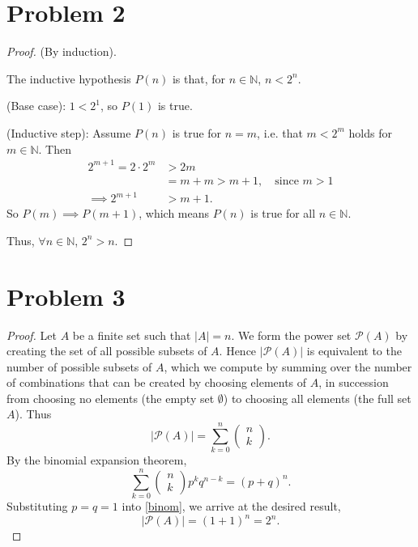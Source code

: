 \documentclass{article}
\begin{document}
\section*{Problem 2}
\begin{proof}
	(By induction). 
	
	The inductive hypothesis $P(n)$ is that, for $n\in\mathbb{N}$, $n<2^n$.
	
	(Base case): $1 < 2^1$, so $P(1)$ is true. 
	
	(Inductive step): Assume $P(n)$ is true for $n=m$, i.e. that $m < 2^m$ holds for $m\in\mathbb{N}$. Then
	\begin{align}
		2^{m+1} = 2 \cdot 2^m &> 2m \\
		&=m + m > m + 1, \quad \textrm{since $m>1$} \\
		\implies 2^{m+1} &> m + 1.
	\end{align}
	So $P(m)\implies P(m+1)$, which means $P(n)$ is true for all $n\in\mathbb{N}$. 
	
	Thus, $\forall n\in\mathbb{N}$, $2^n > n$.
\end{proof}

\section*{Problem 3}
\begin{proof}
	Let $A$ be a finite set such that $|A|=n$. We form the power set $\mathcal{P}(A)$ by creating the set of all possible subsets of $A$. Hence $|\mathcal{P}(A)|$ is equivalent to the number of possible subsets of $A$, which we compute by summing over the number of combinations that can be created by choosing elements of $A$, in succession from choosing no elements (the empty set $\emptyset$) to choosing all elements (the full set $A$). Thus
	\begin{equation}
		|\mathcal{P}(A)| = \sum_{k=0}^n  \begin{pmatrix} n \\ k \end{pmatrix}.
	\end{equation}
	By the binomial expansion theorem,
	\begin{equation}\label{binom}
		\sum_{k=0}^n \begin{pmatrix} n \\ k \end{pmatrix} p^k q^{n-k} = (p+q)^n.
	\end{equation}
	Substituting $p=q=1$ into \eqref{binom}, we arrive at the desired result,
	\begin{equation}
		|\mathcal{P}(A)| = (1 + 1)^n = 2^n.
	\end{equation}
\end{proof}
\end{document}
